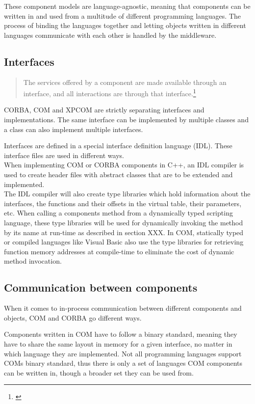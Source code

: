 These component models are language-agnostic, meaning that components can be written in and used from a multitude of different programming languages. The process of binding the languages together and letting objects written in different languages communicate with each other is handled by the middleware.

\subsection{Interfaces}

\begin{quotation}
The services offered by a component are made available through an interface, and all interactions are through that interface.\footnote{\citep[444]{Sommerville}}
\end{quotation}

CORBA, COM and XPCOM are strictly separating interfaces and implementations. The same interface can be implemented by multiple classes and a class can also implement multiple interfaces.

Interfaces are defined in a special interface definition language (IDL). These interface files are used in different ways.\\
When implementing COM or CORBA components in C++, an IDL compiler is used to create header files with abstract classes that are to be extended and implemented.\\
The IDL compiler will also create type libraries which hold information about the interfaces, the functions and their offsets in the virtual table, their parameters, etc. When calling a components method from a dynamically typed scripting language, these type libraries will be used for dynamically invoking the method by its name at run-time as described in section XXX.  In COM, statically typed or compiled languages like Visual Basic also use the type libraries for retrieving function memory addresses at compile-time to eliminate the cost of dynamic method invocation.

\subsection{Communication between components}

When it comes to in-process communication between different components and objects, COM and CORBA go different ways. 

Components written in COM have to follow a binary standard, meaning they have to share the same layout in memory for a given interface, no matter in which language they are implemented. Not all programming languages support COMs binary standard, thus there is only a set of languages COM components can be written in, though a broader set they can be used from.

